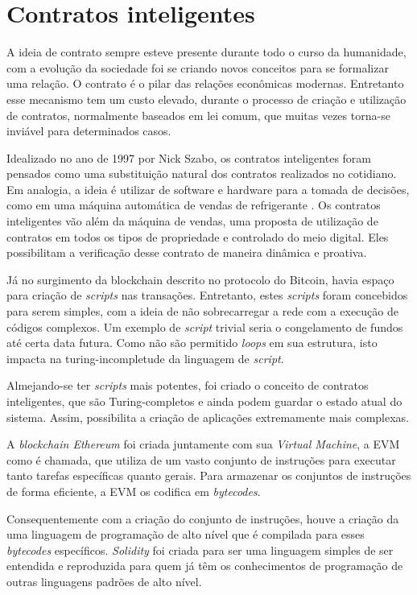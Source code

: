 \documentclass{ufsctex/ufsctex}
\begin{document}
\section{Contratos inteligentes} A ideia de contrato sempre esteve presente
durante todo o curso da humanidade, com a evolução da sociedade foi se criando
novos conceitos para se formalizar uma relação. O contrato é o pilar das
relações econômicas modernas. Entretanto esse mecanismo tem um custo elevado,
durante o processo de criação e utilização de contratos, normalmente baseados em
lei comum, que muitas vezes torna-se inviável para determinados casos.

Idealizado no ano de 1997 por Nick Szabo, os contratos inteligentes foram
pensados como uma substituição natural dos contratos realizados no cotidiano.
Em analogia, a ideia é utilizar de software e hardware para a tomada de
decisões, como em uma máquina automática de vendas de refrigerante
\cite{szabo-smart}. Os contratos inteligentes vão além da máquina de vendas,
uma proposta de utilização de contratos em todos os tipos de propriedade e
controlado do meio digital. Eles possibilitam a verificação desse contrato de
maneira dinâmica e proativa.

Já no surgimento da blockchain descrito no protocolo do Bitcoin, havia espaço
para criação de \textit{scripts} nas transações. Entretanto, estes
\textit{scripts} foram concebidos para serem simples, com a ideia de não
sobrecarregar a rede com a execução de códigos complexos. Um exemplo de
\textit{script} trivial seria o congelamento de fundos até certa data futura.
Como não são  permitido \textit{loops} em sua estrutura, isto impacta na
turing-incompletude da linguagem de \textit{script}. \cite{nakamoto2012bitcoin}

Almejando-se ter \textit{scripts} mais potentes, foi criado o conceito de
contratos inteligentes, que são Turing-completos e ainda podem guardar o estado
atual do sistema.  Assim, possibilita a criação de aplicações extremamente mais
complexas. \cite{ethereum}

A \textit{blockchain Ethereum} foi criada juntamente com sua \textit{Virtual
Machine}, a EVM como é chamada, que
utiliza de um vasto conjunto de instruções para executar tanto tarefas
específicas quanto gerais. Para armazenar os conjuntos de instruções de forma
eficiente, a EVM os codifica em \textit{bytecodes}. \cite{wood2014yellow}

Consequentemente com a criação do conjunto de instruções, houve a criação da uma
linguagem de programação de alto nível que é compilada para esses
\textit{bytecodes} específicos.  \textit{Solidity} foi criada para ser uma
linguagem simples de ser entendida e reproduzida para quem já têm os
conhecimentos de programação de outras linguagens padrões de alto nível.
\cite{solidity}
\end{document}
